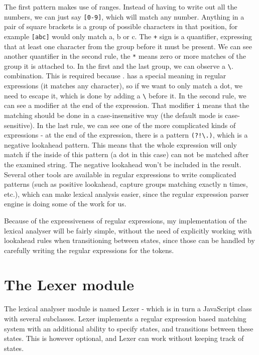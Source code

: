 The first pattern makes use of ranges. Instead of having to write out all the numbers, we can just say \texttt{[0-9]}, which will match any number. Anything in a pair of square brackets is a group of possible characters in that position, for example \texttt{[abc]} would only match a, b or c. The \texttt{+} sign is a quantifier, expressing that at least one character from the group before it must be present. We can see another quantifier in the second rule, the \texttt{*} means zero or more matches of the group it is attached to. In the first and the last group, we can observe a \texttt{\textbackslash}. combination. This is required because . has a special meaning in regular expressions (it matches any character), so if we want to only match a dot, we need to escape it, which is done by adding a \texttt{\textbackslash} before it. In the second rule, we can see a modifier at the end of the expression. That modifier \texttt{i} means that the matching should be done in a case-insensitive way (the default mode is case-sensitive). In the last rule, we can see one of the more complicated kinds of expressions - at the end of the expression, there is a pattern \texttt{(?!\textbackslash.)}, which is a negative lookahead pattern. This means that the whole expression will only match if the inside of this pattern (a dot in this case) can not be matched after the examined string. The negative lookahead won't be included in the result. Several other tools are available in regular expressions to write complicated patterns (such as positive lookahead, capture groups matching exactly n times, etc.), which can make lexical analysis easier, since the regular expression parser engine is doing some of the work for us.

Because of the expressiveness of regular expressions, my implementation of the lexical analyser will be fairly simple, without the need of explicitly working with lookahead rules when transitioning between states, since those can be handled by carefully writing the regular expressions for the tokens.
\section{The Lexer module}
The lexical analyser module is named Lexer - which is in turn a JavaScript class with several subclasses. Lexer implements a regular expression based matching system with an additional ability to specify states, and transitions between these states. This is however optional, and Lexer can work without keeping track of states.

